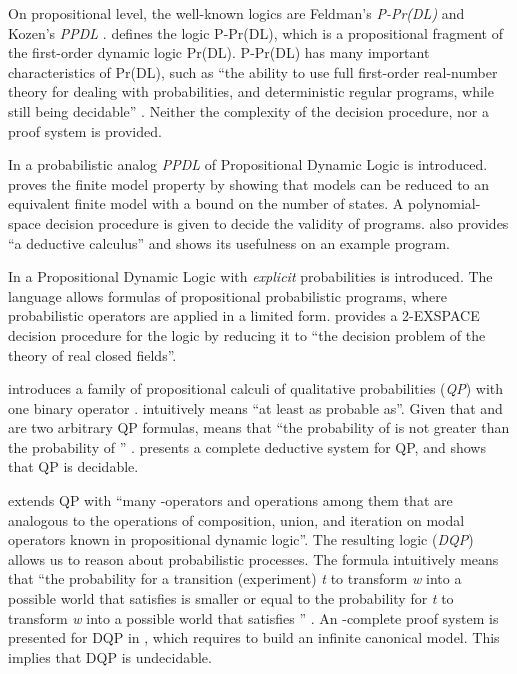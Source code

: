 \documentclass[11pt]{article}
\begin{document}
On propositional level, the well-known logics are Feldman's  \emph{P-Pr(DL)} \cite{Fei83} and Kozen's \emph{PPDL} \cite{Koz83}. \cite{Fei83} defines the logic P-Pr(DL), which is a propositional fragment of the first-order dynamic logic Pr(DL). P-Pr(DL) has many important characteristics of Pr(DL), such as ``the ability to use full first-order real-number theory for dealing with probabilities, and deterministic regular programs, while still being decidable'' \cite{Fei83}. Neither the complexity of the decision procedure, nor a proof system is provided. 

In \cite{Koz83} a probabilistic analog \emph{PPDL} of Propositional Dynamic Logic is introduced. \cite{Koz83} proves the  finite model property by showing that models can be reduced to an equivalent finite model with a bound on the number of states. A polynomial-space decision procedure is given to decide the validity of programs. \cite{Koz83} also provides ``a deductive calculus'' and shows its usefulness on an example program.

In \cite{Fel84} a Propositional Dynamic Logic with \emph{explicit} probabilities is introduced. The language allows formulas of propositional probabilistic programs, where probabilistic operators are applied in a limited form.  \cite{Fel84} provides a 2-EXSPACE decision procedure for the logic by reducing it to ``the decision problem of the theory of real closed fields''. 

\cite{Seg71} introduces a family of propositional calculi of qualitative probabilities (\emph{QP}) with one binary operator .  intuitively means ``at least as probable as''. Given that  and  are two arbitrary QP formulas,  means that ``the probability of  is not greater than the probability of '' \cite{Gue99}.  \cite{Seg71} presents a complete deductive system for QP, and shows that QP is decidable.

\cite{Gue99} extends QP with ``many -operators and operations among them that are analogous to the operations of composition, union, and iteration on modal operators known in propositional dynamic logic''.  The resulting logic (\emph{DQP}) allows us to reason about probabilistic processes. The formula  intuitively means that ``the probability for a transition (experiment) \emph{t} to transform \emph{w} into a possible world that satisfies  is smaller or equal to the probability for \emph{t} to transform \emph{w} into a possible world that satisfies ''  \cite{Gue99}.  An -complete proof system is presented for DQP in \cite{Gue99}, which requires to build an infinite canonical model. This implies that DQP is undecidable. 
\end{document}
